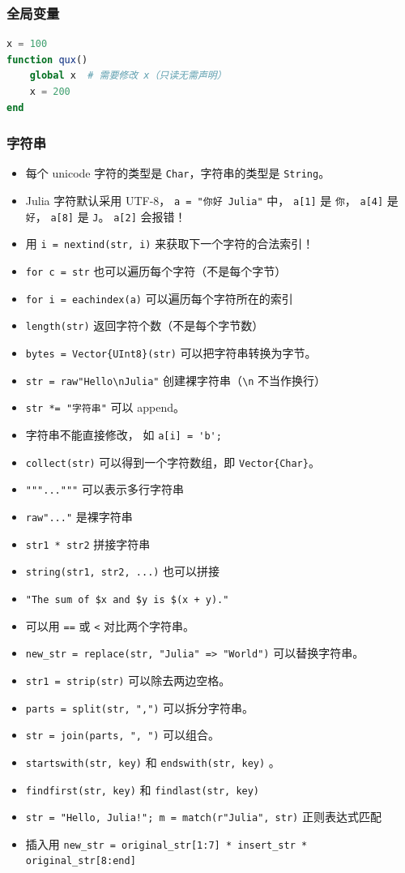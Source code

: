 \subsubsection{全局变量}
\begin{lstlisting}[language=julia]
x = 100
function qux()
    global x  # 需要修改 x（只读无需声明）
    x = 200
end
\end{lstlisting}

\subsubsection{字符串}
\begin{itemize}
\item 每个 unicode 字符的类型是 \verb`Char`，字符串的类型是 \verb`String`。
\item Julia 字符默认采用 UTF-8， \verb`a = "你好 Julia"` 中， \verb`a[1]` 是 \verb`你`， \verb`a[4]` 是 \verb`好`， \verb`a[8]` 是 \verb`J`。 \verb`a[2]` 会报错！
\item 用 \verb`i = nextind(str, i)` 来获取下一个字符的合法索引！
\item \verb`for c = str` 也可以遍历每个字符（不是每个字节）
\item \verb`for i = eachindex(a)` 可以遍历每个字符所在的索引
\item \verb`length(str)` 返回字符个数（不是每个字节数）
\item \verb`bytes = Vector{UInt8}(str)` 可以把字符串转换为字节。
\item \verb`str = raw"Hello\nJulia"` 创建裸字符串（\verb`\n` 不当作换行）
\item \verb`str *= "字符串"` 可以 append。
\item 字符串不能直接修改， 如 \verb`a[i] = 'b';`
\item \verb`collect(str)` 可以得到一个字符数组，即 \verb`Vector{Char}`。
\item \verb`"""..."""` 可以表示多行字符串
\item \verb`raw"..."` 是裸字符串
\item \verb`str1 * str2` 拼接字符串
\item \verb`string(str1, str2, ...)` 也可以拼接
\item \verb`"The sum of $x and $y is $(x + y)."`
\item 可以用 \verb`==` 或 \verb`<` 对比两个字符串。
\item \verb`new_str = replace(str, "Julia" => "World")` 可以替换字符串。
\item \verb`str1 = strip(str)` 可以除去两边空格。
\item \verb`parts = split(str, ",")` 可以拆分字符串。
\item \verb`str = join(parts, ", ")` 可以组合。
\item \verb`startswith(str, key)` 和 \verb`endswith(str, key)` 。
\item \verb`findfirst(str, key)` 和 \verb`findlast(str, key)`
\item \verb`str = "Hello, Julia!"; m = match(r"Julia", str)` 正则表达式匹配
\item 插入用 \verb`new_str = original_str[1:7] * insert_str * original_str[8:end]`
\end{itemize}

